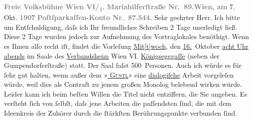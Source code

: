 \begin{ledgroupsized}[t]{13cm}
           \noindent{}{\pb}\textcolor{gray}{\textbf{Freie Volksbühne}}\pend
           \pstart
           \textcolor{gray}{\textbf{Wien VI/\textsubscript{1}.}}\pend
           \pstart
           \textcolor{gray}{\textbf{Mariahilferſtraße Nr. 89.}}\hfill \textcolor{gray}{\textbf{Wien, am}} 7. Okt. \textcolor{gray}{\textbf{190}}7\pend
           \pstart
           \textcolor{gray}{\textbf{Poſtſparkaſſen-Konto Nr. 87.544.}}\pend
           \pstart\center{}Sehr geehrter Herr.\pend\pstart
           Ich bitte um Entſchuldigung, daſs ich Ihr freundliches Schreiben 2 Tage unerledigt
               ließ.\pend
           \pstart
           Diese 2 Tage wurden jedoch zur Aufnehmung des Vortraglokales benöthigt. Wenn es Ihnen
               alſo recht iſt, findet die Vorleſung\pend
           \pstart
           \centering{}\uline{Mit{[}t{]}woch}, den \uline{16.} Oktober\pend
           \pstart
           \noindent{}\centering{}\uline{acht Uhr abends}\pend
           \pstart
           \noindent{}im Saale des \uline{Verbandsheim}{ }Wien VI. \uline{Königsegggaſſe} (neben der Gumpendorferſtraße) statt. Der
               Saal faſst 500 Personen.\pend
           \pstart
           Auch ich würde es für ſehr gut halten, wenn außer {\pb}dem »\textsc{\uline{\label{T_L01717_1v}\label{T_L01717_1h}}}\textsc{\uline{{ }Gustl}}« eine \uline{dialogiſche} Arbeit vorgeleſen würde, weil
               dies als Contraſt zu jenem großen  Monolog
               belebend wirken würde. Leider kann ich beim beſten Willen die  Titel nicht entziffern, die Sie angeben.\pend
           \pstart
           Es verſteht ſich von ſelbſt, daſs jene Arbeiten die paſſendsten ſind, die mit dem
               Ideenkreis der Zuhörer \introOben{}durch\introOben{} die ſtärkſten  Berührungspunkte verbunden ſind.\pend

\end{ledgroupsized}
